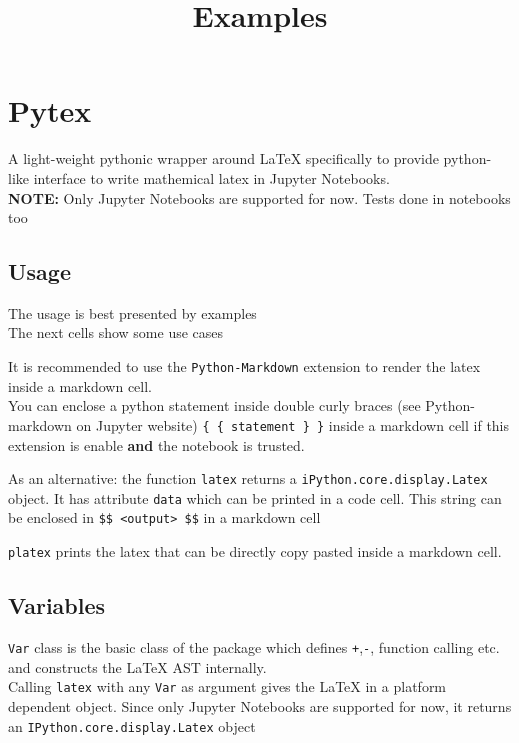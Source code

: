 \documentclass[11pt]{article}
\title{Examples}
\begin{document}
    
    \maketitle
    
    

    
    \hypertarget{pytex}{%
\section{Pytex}\label{pytex}}

A light-weight pythonic wrapper around LaTeX specifically to provide
python-like interface to write mathemical latex in Jupyter Notebooks.\\
\textbf{NOTE:} Only Jupyter Notebooks are supported for now. Tests done
in notebooks too

\hypertarget{usage}{%
\subsection{Usage}\label{usage}}

The usage is best presented by examples\\
The next cells show some use cases

It is recommended to use the \texttt{Python-Markdown} extension to
render the latex inside a markdown cell.\\
You can enclose a python statement inside double curly braces (see
Python-markdown on Jupyter website) \texttt{\{\ \{\ statement\ \}\ \}}
inside a markdown cell if this extension is enable \textbf{and} the
notebook is trusted.

As an alternative: the function \texttt{latex} returns a
\texttt{iPython.core.display.Latex} object. It has attribute
\texttt{data} which can be printed in a code cell. This string can be
enclosed in \texttt{\$\$\ \textless{}output\textgreater{}\ \$\$} in a
markdown cell

\texttt{platex} prints the latex that can be directly copy pasted inside
a markdown cell.

    \hypertarget{variables}{%
\subsection{Variables}\label{variables}}

\texttt{Var} class is the basic class of the package which defines
\texttt{+},\texttt{-}, function calling etc. and constructs the LaTeX
AST internally.\\
Calling \texttt{latex} with any \texttt{Var} as argument gives the LaTeX
in a platform dependent object. Since only Jupyter Notebooks are
supported for now, it returns an \texttt{IPython.core.display.Latex}
object
\end{document}
